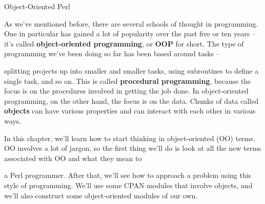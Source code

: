 \documentclass[a4paper,11pt]{book}
\begin{document}

\noindent 

\noindent 

\noindent 

\noindent 

\noindent 

\noindent 

\noindent 

\noindent 

\noindent 

\noindent 

\noindent 

\noindent 

\noindent 

\noindent 

\noindent 

\noindent Object-Oriented Perl

\noindent 

\noindent 

\noindent 

\noindent 

\noindent As we've mentioned before, there are several schools of thought in programming. One in particular has gained a lot of popularity over the past five or ten years -- it's called \textbf{object-oriented programming}, or \textbf{OOP }for short. The type of programming we've been doing so far has been based around tasks --

\noindent splitting projects up into smaller and smaller tasks, using subroutines to define a single task, and so on. This is called \textbf{procedural programming}, because the focus is on the procedures involved in getting the job done. In object-oriented programming, on the other hand, the focus is on the data. Chunks of data called \textbf{objects }can have various properties and can interact with each other in various ways.

\noindent 

\noindent In this chapter, we'll learn how to start thinking in object-oriented (OO) terms. OO involves a lot of jargon, so the first thing we'll do is look at all the new terms associated with OO and what they mean to

\noindent a Perl programmer. After that, we'll see how to approach a problem using this style of programming. We'll use some CPAN modules that involve objects, and we'll also construct some object-oriented modules of our own.
\end{document}
